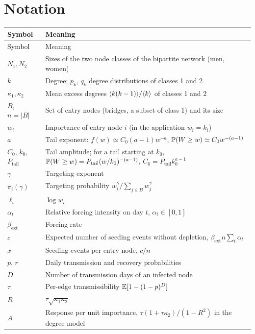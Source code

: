 \section{Notation}
\begin{longtable}{p{2.6cm}p{12.6cm}}
\toprule Symbol & Meaning \\ \midrule \endfirsthead
\toprule Symbol & Meaning \\ \midrule \endhead
$N_1,N_2$ & Sizes of the two node classes of the bipartite network (men, women) \\
$k$ & Degree; $p_k$, $q_k$ degree distributions of classes 1 and 2 \\
$\kappa_1,\kappa_2$ & Mean excess degrees $\langle k(k-1)\rangle/\langle k\rangle$ of classes 1 and 2 \\
$B$, $n=|B|$ & Set of entry nodes (bridges, a subset of class 1) and its size \\
$w_i$ & Importance of entry node $i$ (in the application $w_i=k_i$) \\
$a$ & Tail exponent: $f(w)\simeq C_0(a-1)w^{-a}$, $\mathbb{P}(W\ge w)\simeq C_0w^{-(a-1)}$ \\
$C_0$, $k_0$, $P_{\mathrm{tail}}$ & Tail amplitude; for a tail starting at $k_0$, $\mathbb{P}(W\ge w)=P_{\mathrm{tail}}(w/k_0)^{-(a-1)}$, $C_0=P_{\mathrm{tail}}k_0^{a-1}$ \\
$\gamma$ & Targeting exponent \\
$\pi_i(\gamma)$ & Targeting probability $w_i^\gamma/\sum_{j\in B}w_j^\gamma$ \\
$\ell_i$ & $\log w_i$ \\
$\alpha_t$ & Relative forcing intensity on day $t$, $\alpha_t\in[0,1]$ \\
$\beta_{\mathrm{ext}}$ & Forcing rate \\
$c$ & Expected number of seeding events without depletion, $\beta_{\mathrm{ext}}n\sum_t\alpha_t$ \\
$x$ & Seeding events per entry node, $c/n$ \\
$p$, $r$ & Daily transmission and recovery probabilities \\
$D$ & Number of transmission days of an infected node \\
$\tau$ & Per-edge transmissibility $\mathbb{E}[1-(1-p)^D]$ \\
$R$ & $\tau\sqrt{\kappa_1\kappa_2}$ \\
$A$ & Response per unit importance, $\tau(1+\tau\kappa_2)/(1-R^2)$ in the degree model \\

\end{longtable}
